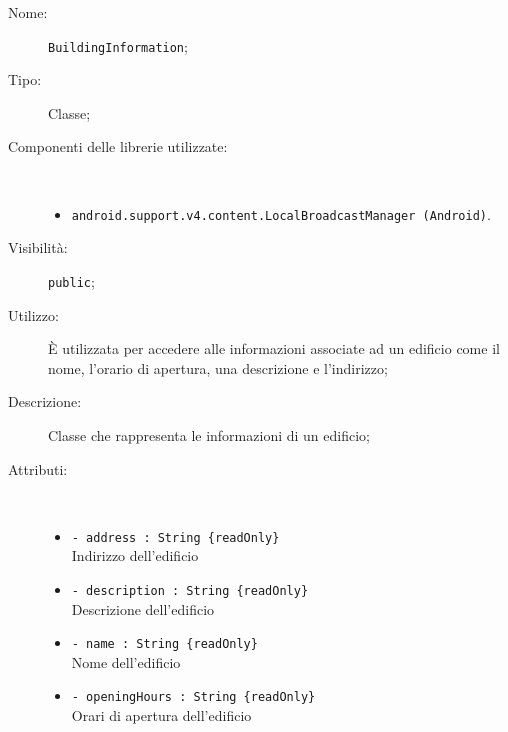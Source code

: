 \documentclass[../DefinizioneDiProdotto.tex]{subfiles}
\begin{document}
    \begin{description}
\item[Nome:] \texttt{BuildingInformation};
\item[Tipo:] Classe;
\item[Componenti delle librerie utilizzate:] \
\begin{itemize}
\item \texttt{android.support.v4.content.LocalBroadcastManager (Android)}.

\end{itemize}
\item[Visibilità:] \texttt{public};
\item[Utilizzo:] È utilizzata per accedere alle informazioni associate ad un edificio come il nome, l'orario di apertura, una descrizione e l'indirizzo;
\item[Descrizione:] Classe che rappresenta le informazioni di un edificio;
\item[Attributi:] \
\begin{itemize}
\item \texttt{- address : String  \{readOnly\}}\\
Indirizzo dell'edificio

\item \texttt{- description : String  \{readOnly\}}\\
Descrizione dell'edificio

\item \texttt{- name : String  \{readOnly\}}\\
Nome dell'edificio

\item \texttt{- openingHours : String  \{readOnly\}}\\
Orari di apertura dell'edificio


\end{itemize}
\end{description}
\end{document}
